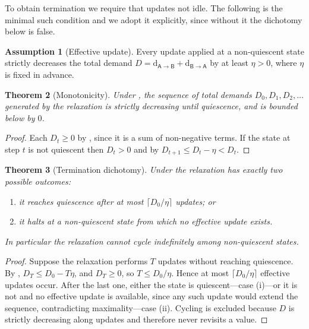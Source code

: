 \documentclass[11pt,twocolumn,a4paper]{article}
\newtheorem{theorem}{Theorem}[section]
\theoremstyle{definition}
\newtheorem{assumption}[theorem]{Assumption}
\theoremstyle{remark}
\newcommand{\dem}{\mathrm{d}}
\newcommand{\colA}{\mathsf{A}}
\newcommand{\colB}{\mathsf{B}}
\begin{document}
To obtain termination we require that updates not idle. The following is
the minimal such condition and we adopt it explicitly, since without it
the dichotomy below is false.

\begin{assumption}[Effective update]
\label{ass:effective}
Every update applied at a non-quiescent state strictly decreases the
total demand $D=\dem_{\colA\to\colB}+\dem_{\colB\to\colA}$ by at least
$\eta>0$, where $\eta$ is fixed in advance.
\end{assumption}

\begin{theorem}[Monotonicity]
\label{thm:mono}
Under , the sequence of total demands
$D_0,D_1,D_2,\dots$ generated by the relaxation is strictly decreasing
until quiescence, and is bounded below by $0$.
\end{theorem}

\begin{proof}
Each $D_t\ge0$ by , since it is a sum of non-negative
terms. If the state at step $t$ is not quiescent then $D_t>0$ and by
 $D_{t+1}\le D_t-\eta<D_t$.
\end{proof}

\begin{theorem}[Termination dichotomy]
\label{thm:dichotomy}
Under  the relaxation has exactly two possible
outcomes:
\begin{enumerate}[label=\textup{(\roman*)},leftmargin=2.2em]
  \item it reaches quiescence after at most $\lceil D_0/\eta\rceil$
  updates; or
  \item it halts at a non-quiescent state from which no effective update
  exists.
\end{enumerate}
In particular the relaxation cannot cycle indefinitely among
non-quiescent states.
\end{theorem}

\begin{proof}
Suppose the relaxation performs $T$ updates without reaching quiescence.
By , $D_T\le D_0-T\eta$, and $D_T\ge0$, so
$T\le D_0/\eta$. Hence at most $\lceil D_0/\eta\rceil$ effective updates
occur. After the last one, either the state is quiescent---case (i)---or
it is not and no effective update is available, since any such update
would extend the sequence, contradicting maximality---case (ii). Cycling
is excluded because $D$ is strictly decreasing along updates and therefore
never revisits a value.
\end{proof}
\end{document}
